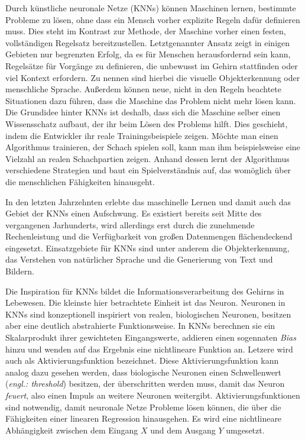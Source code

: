 Durch künstliche neuronale Netze (\acsp{KNN}) können Maschinen lernen, bestimmte Probleme zu lösen, ohne dass ein Mensch vorher explizite Regeln dafür definieren muss. Dies steht im Kontrast zur Methode, der Maschine  vorher einen festen, vollständigen Regelsatz bereitzustellen. Letztgenannter Ansatz zeigt in einigen Gebieten nur begrenzten Erfolg, da es für Menschen herausfordernd sein kann, Regelsätze für Vorgänge zu definieren, die unbewusst im Gehirn stattfinden oder viel Kontext erfordern. Zu nennen sind hierbei die visuelle Objekterkennung oder menschliche Sprache. Außerdem können neue, nicht in den Regeln beachtete Situationen dazu führen, dass die Maschine das Problem nicht mehr lösen kann. Die Grundidee hinter \acp{KNN} ist deshalb, dass sich die Maschine selber einen Wissensschatz aufbaut, der ihr beim Lösen des Problems hilft. Dies geschieht, indem die Entwickler ihr reale Trainingsbeispiele zeigen. Möchte man einen Algorithmus trainieren, der Schach spielen soll, kann man ihm beispielsweise eine Vielzahl an realen Schachpartien zeigen. Anhand dessen lernt der Algorithmus verschiedene Strategien und baut ein Spielverständnis auf, das womöglich über die menschlichen Fähigkeiten hinausgeht. \cite[S. 1ff.]{DeepLearningBook}

In den letzten Jahrzehnten erlebte das maschinelle Lernen und damit auch das Gebiet der \acp{KNN} einen Aufschwung. Es existiert bereits seit Mitte des vergangenen Jarhunderts, wird allerdings erst durch die zunehmende Rechenleistung und die Verfügbarkeit von großen Datenmengen flächendeckend eingesetzt. Einsatzgebiete für \acp{KNN} sind unter anderem die Objekterkennung, das Verstehen von natürlicher Sprache und die Generierung von Text und Bildern. \cite[S. 4,17]{knnsKompakt}

Die Inspiration für \acp{KNN} bildet die Informationsverarbeitung des Gehirns in Lebewesen. Die kleinste hier betrachtete Einheit ist das Neuron. Neuronen in \acp{KNN} sind konzeptionell inspiriert von realen, biologischen Neuronen, besitzen aber eine deutlich abstrahierte Funktionsweise. In \acp{KNN} berechnen sie ein Skalarprodukt ihrer gewichteten Eingangswerte, addieren einen sogennaten \emph{Bias} hinzu und wenden auf das Ergebnis eine nichtlineare Funktion an. Letzere wird auch als Aktivierungsfunktion bezeichnet. Diese Aktivierungsfunktion kann analog dazu gesehen werden, dass biologische Neuronen einen Schwellenwert (\emph{engl.: threshold}) besitzen, der überschritten werden muss, damit das Neuron \emph{feuert}, also einen Impuls an weitere Neuronen weitergibt. Aktivierungsfunktionen sind notwendig, damit neuronale Netze Probleme lösen können, die über die Fähigkeiten einer linearen Regression hinausgehen. Es wird eine nichtlineare Abhängigkeit zwischen dem Eingang $X$ und dem Ausgang $Y$ umgesetzt. \cite{visualApproach}

